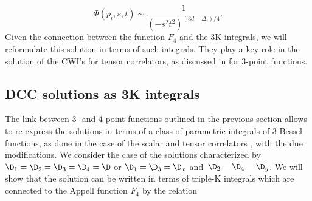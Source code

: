 \documentclass[a4paper,11pt,openright,twoside]{book}
\numberwithin{equation}{section}
\begin{document}
{\begin{equation}
	\Phi(p_i,s,t)\sim \frac{1}{(- s^2 t^2)^{(3 d - \Delta_t)/4}}. 
\end{equation}
Given the connection between the function $F_4$ and the 3K integrals, we will reformulate this solution in terms of such integrals. They play a key role in the solution of the CWI's for tensor correlators, as discussed in \cite{Bzowski:2013sza} for 3-point functions.


\subsection{DCC solutions as 3K integrals}
The link between 3- and 4-point functions outlined in the previous section allows to re-express the solutions in terms of a class of parametric integrals of 3 Bessel functions, as done in the case of the  scalar and tensor correlators  \cite{Bzowski:2013sza}, with the due modifications.
We consider the case of the solutions characterized by $\D_1=\D_2=\D_3=\D_4=\D$ or $\D_1=\D_3=\D_x$ and\  $\D_2=\D_4=\D_y$. We will show that the solution can be written in terms of triple-K integrals which are connected to the Appell function $F_4$ by the relation 

}
\end{document}
